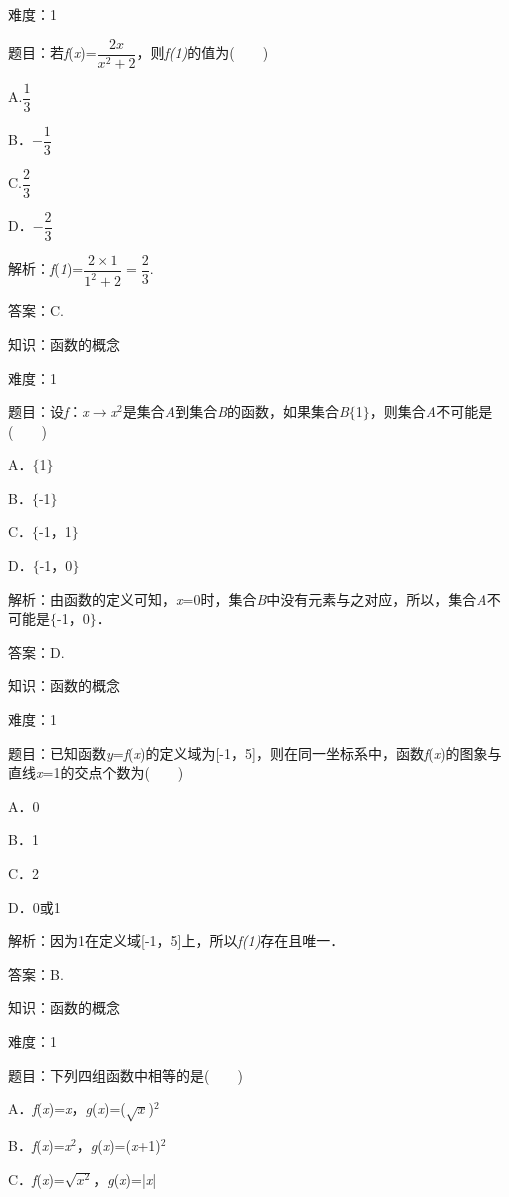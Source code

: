 \documentclass{article} %
\begin{document}
难度：1

题目：若\textit{f}(\textit{x})=$\dfrac{2x}{x^{2}+2}$，则\textit{f(1)}的值为(　　)

A.$\dfrac{1}{3}$　　

B．$-\dfrac{1}{3}$　　

C.$\dfrac{2}{3}$　

D．$-\dfrac{2}{3}$

解析：\textit{f}(\textit{1})=$\dfrac{2\times 1}{1^{2}+2}=\dfrac{2}{3}$.

答案：C.

知识：函数的概念

难度：1

题目：设\textit{f}：\textit{x}$\mathrm{\to}$\textit{x}${}^{2}$是集合\textit{A}到集合\textit{B}的函数，如果集合\textit{B}$\mathrm{\{}$1$\mathrm{\}}$，则集合\textit{A}不可能是(　　)

A．$\mathrm{\{}$1$\mathrm{\}}$   

B．$\mathrm{\{}$-1$\mathrm{\}}$

C．$\mathrm{\{}$-1，1$\mathrm{\}}$   

D．$\mathrm{\{}$-1，0$\mathrm{\}}$

解析：由函数的定义可知，\textit{x}=0时，集合\textit{B}中没有元素与之对应，所以，集合\textit{A}不可能是$\mathrm{\{}$-1，0$\mathrm{\}}$．

答案：D.

知识：函数的概念

难度：1

题目：已知函数\textit{y}=\textit{f}(\textit{x})的定义域为[-1，5]，则在同一坐标系中，函数\textit{f}(\textit{x})的图象与直线\textit{x}=1的交点个数为(　　)

A．0  

B．1  

C．2  

D．0或1

解析：因为1在定义域[-1，5]上，所以\textit{f(1)}存在且唯一．

答案：B.

知识：函数的概念

难度：1

题目：下列四组函数中相等的是(　　)

A．\textit{f}(\textit{x})=\textit{x}，\textit{g}(\textit{x})=($\sqrt{x}$)${}^{2}$

B．\textit{f}(\textit{x})=\textit{x}${}^{2}$，\textit{g}(\textit{x})=(\textit{x}+1)${}^{2}$

C．\textit{f}(\textit{x})=$\sqrt{x^{2}}$，\textit{g}(\textit{x})=|\textit{x}|
\end{document}
